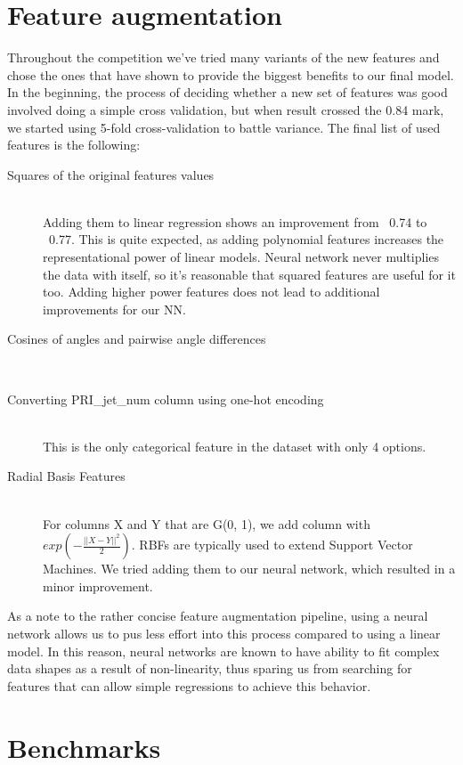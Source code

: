 \documentclass[10pt,conference,compsocconf]{IEEEtran}
\begin{document}
\section{Feature augmentation}
Throughout the competition we've tried many variants of the new features and chose the ones that have shown to provide the biggest benefits to our final model. In the beginning, the process of deciding whether a new set of features was good involved doing a simple cross validation, but when result crossed the 0.84 mark, we started using 5-fold cross-validation to battle variance. The final list of used features is the following:
\begin{description}
\item[Squares of the original features values] \ \\
	Adding them to linear regression shows an improvement from ~0.74 to ~0.77. This is quite expected, as adding polynomial features increases the representational power of linear models. Neural network never multiplies the data with itself, so it's reasonable that squared features are useful for it too. Adding higher power features does not lead to additional improvements for our NN.
	
\item[Cosines of angles and pairwise angle differences] \ \\
	
\item[Converting PRI\_jet\_num column using one-hot encoding] \ \\
	This is the only categorical feature in the dataset with only 4 options.
	
\item[Radial Basis Features] \ \\
	For columns X and Y that are G(0, 1), we add column with $exp(-\frac{||X-Y||^2}{2})$.
	RBFs \cite{rbf_book} \cite{rbf_wiki} are typically used to extend Support Vector Machines. We tried adding them to our neural network, which resulted in a minor improvement.
\end{description}

As a note to the rather concise feature augmentation pipeline, using a neural network allows us to pus less effort into this process compared to using a linear model. In this reason, neural networks are known to have ability to fit complex data shapes as a result of non-linearity, thus sparing us from searching for features that can allow simple regressions to achieve this behavior.

\section{Benchmarks}
\end{document}
